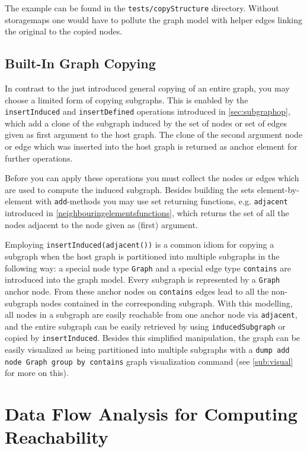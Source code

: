 The example can be found in the \texttt{tests/copyStructure} directory.
Without storagemaps one would have to pollute the graph model with helper edges linking the original to the copied nodes.

\subsection{Built-In Graph Copying}\label{builtingraphcopying}
In contrast to the just introduced general copying of an entire graph, you may choose a limited form of copying subgraphs.
This is enabled by the \texttt{insertInduced} and \texttt{insertDefined} operations introduced in \ref{sec:subgraphop}, which add a clone of the subgraph induced by the set of nodes or set of edges given as first argument to the host graph.
The clone of the second argument node or edge which was inserted into the host graph is returned as anchor element for further operations.

Before you can apply these operations you must collect the nodes or edges which are used to compute the induced subgraph.
Besides building the sets element-by-element with \texttt{add}-methods you may use set returning functions, e.g. \texttt{adjacent} introduced in \ref{neighbouringelementsfunctions}, which returns the set of all the nodes adjacent to the node given as (first) argument.

Employing \texttt{insertInduced(adjacent())} is a common idiom for copying a subgraph when the host graph is partitioned into multiple subgraphs in the following way:
a special node type \texttt{Graph} and a special edge type \texttt{contains} are introduced into the graph model. 
Every subgraph is represented by a \texttt{Graph} anchor node.
From these anchor nodes on \texttt{contains} edges lead to all the non-subgraph nodes contained in the corresponding subgraph.
With this modelling, all nodes in a subgraph are easily reachable from one anchor node via \texttt{adjacent}, and the entire subgraph can be easily retrieved by using \texttt{inducedSubgraph} or copied by \texttt{insertInduced}.
Besides this simplified manipulation, the graph can be easily visualized as being partitioned into multiple subgraphs with a \texttt{dump add node Graph group by contains} graph visualization command (see \ref{sub:visual} for more on this).


\section{Data Flow Analysis for Computing Reachability}\label{subsub:flow}


